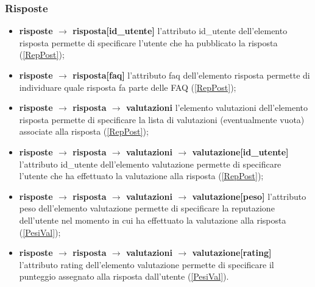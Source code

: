 \documentclass[a4paper, 14pt]{article}
\begin{document}
\begin{flushleft}
			\subsubsection{Risposte} 
				\begin{itemize}
					\item \textbf{risposte $\rightarrow$ risposta[id\_utente] } l'attributo id\_utente dell'elemento risposta permette di specificare l'utente che ha pubblicato la risposta (\ref{RepPost});
					\item \textbf{risposte $\rightarrow$ risposta[faq] } l'attributo faq dell'elemento risposta permette di individuare quale risposta  fa parte delle FAQ (\ref{RepPost});
					\item \textbf{risposte $\rightarrow$ risposta $\rightarrow$ valutazioni } l'elemento valutazioni dell'elemento risposta permette di specificare la lista di valutazioni (eventualmente vuota) associate alla risposta (\ref{RepPost});
					\item \textbf{risposte $\rightarrow$ risposta $\rightarrow$ valutazioni $\rightarrow$ valutazione[id\_utente]} l'attributo id\_utente dell'elemento valutazione permette di specificare l'utente che ha effettuato la valutazione alla risposta (\ref{RepPost});
					\item \textbf{risposte $\rightarrow$ risposta $\rightarrow$ valutazioni $\rightarrow$ valutazione[peso]} l'attributo peso dell'elemento valutazione permette di specificare la reputazione dell'utente nel momento in cui ha effettuato la valutazione alla risposta (\ref{PesiVal});
					\item \textbf{risposte $\rightarrow$ risposta $\rightarrow$ valutazioni $\rightarrow$ valutazione[rating]} l'attributo rating dell'elemento valutazione permette di specificare il punteggio assegnato alla risposta dall'utente (\ref{PesiVal}).		
				\end{itemize}
			\smallskip

\end{flushleft}
\end{document}
